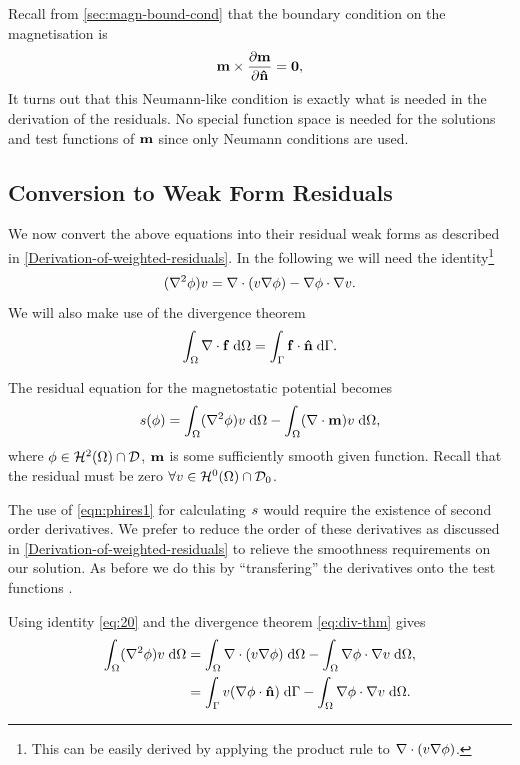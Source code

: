 Recall from \autoref{sec:magn-bound-cond} that the boundary condition on the magnetisation is
\begin{equation}
  \label{eq:m-bc}
  \mathbf{m} \times \frac{\partial \mathbf{m}}{\partial \mathbf{\hat{n}}} = \mathbf{0},
\end{equation}
It turns out that this Neumann-like condition is exactly what is needed in the derivation of the residuals.
No special function space is needed for the solutions and test functions of $\mathbf{m}$ since only Neumann conditions are used.


\subsection{Conversion to Weak Form Residuals}

We now convert the above equations into their residual weak forms as described in \autoref{Derivation-of-weighted-residuals}.
In the following we will need the identity\footnote{This can be easily derived by applying the product rule to $\nabla \cdot (v \nabla \phi)$.}
\begin{equation}
  (\nabla^2 \phi) v = \nabla \cdot (v \nabla \phi) - \nabla \phi \cdot \nabla v.
  \label{eq:20}
\end{equation}
We will also make use of the divergence theorem
\begin{equation}
  {\int_{\Omega} \nabla \cdot{\mathbf{f}}{\; \text{d}}{\Omega}} = {\int_{{\Gamma}} {\mathbf{f}} \cdot \mathbf{\hat{n}} {\; \text{d}} {{\Gamma}}}.
  \label{eq:div-thm}
\end{equation}

The residual equation for the magnetostatic potential becomes
\begin{gather}
  s(\phi) = {\int_{\Omega}  (\nabla^2 \phi) v  {\; \text{d}} {\Omega}}
  - {\int_{\Omega}  (\nabla \cdot \mathbf{m}) v {\; \text{d}} {\Omega}}, \label{eqn:phires1}
\end{gather}
where $\phi \in \mathcal{H}^2(\Omega) \cap \mathcal{D}$, $\mathbf{m}$ is some sufficiently smooth given function.
Recall that the  residual must be zero $\forall v \in \mathcal{H}^0(\Omega) \cap \mathcal{D}_0$.

The use of \eqref{eqn:phires1} for calculating $s$ would require the existence of second order derivatives.
We prefer to reduce the order of these derivatives as discussed in \autoref{Derivation-of-weighted-residuals} to relieve the smoothness requirements on our solution.
As before we do this by ``transfering'' the derivatives onto the test functions \cite{HowardElmanDavidSilvester2006}.

Using identity \eqref{eq:20} and the divergence theorem \eqref{eq:div-thm} gives
\begin{equation}
  \begin{aligned}
    {\int_{\Omega}  (\nabla^2\phi) v{\; \text{d}}{\Omega}} &=  {\int_{\Omega} \nabla \cdot (v \nabla \phi) {\; \text{d}} {\Omega}}
           - {\int_{\Omega} \nabla \phi \cdot \nabla v {\; \text{d}} {\Omega}},\\
    &= {\int_{{\Gamma}} v (\nabla \phi \cdot \mathbf{\hat{n}}) {\; \text{d}} {{\Gamma}}} 
    - {\int_{\Omega}  \nabla \phi \cdot \nabla v {\; \text{d}} {\Omega}}.
    \label{eqn:identitygauss}
  \end{aligned} 
\end{equation}

